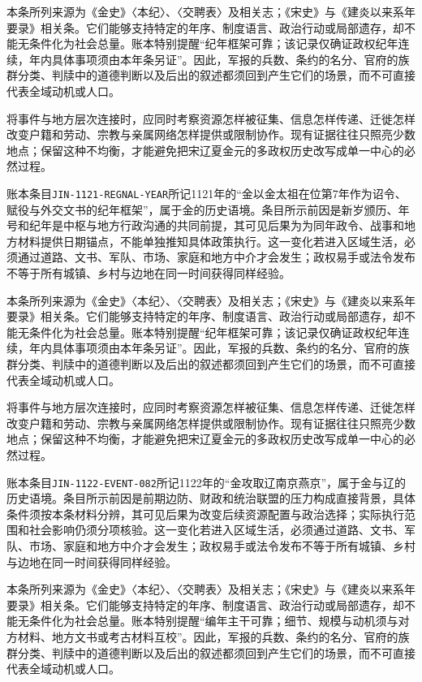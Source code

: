 本条所列来源为《金史》〈本纪〉、〈交聘表〉及相关志；《宋史》与《建炎以来系年要录》相关条。它们能够支持特定的年序、制度语言、政治行动或局部遗存，却不能无条件化为社会总量。账本特别提醒“纪年框架可靠；该记录仅确证政权纪年连续，年内具体事项须由本年条另证”。因此，军报的兵数、条约的名分、官府的族群分类、判牍中的道德判断以及后出的叙述都须回到产生它们的场景，而不可直接代表全域动机或人口。

将事件与地方层次连接时，应同时考察资源怎样被征集、信息怎样传递、迁徙怎样改变户籍和劳动、宗教与亲属网络怎样提供或限制协作。现有证据往往只照亮少数地点；保留这种不均衡，才能避免把宋辽夏金元的多政权历史改写成单一中心的必然过程。

账本条目\texttt{JIN-1121-REGNAL-YEAR}所记1121年的“金以金太祖在位第7年作为诏令、赋役与外交文书的纪年框架”，属于金的历史语境。条目所示前因是新岁颁历、年号和纪年是中枢与地方行政沟通的共同前提，其可见后果为为同年政令、战事和地方材料提供日期锚点，不能单独推知具体政策执行。这一变化若进入区域生活，必须通过道路、文书、军队、市场、家庭和地方中介才会发生；政权易手或法令发布不等于所有城镇、乡村与边地在同一时间获得同样经验。

本条所列来源为《金史》〈本纪〉、〈交聘表〉及相关志；《宋史》与《建炎以来系年要录》相关条。它们能够支持特定的年序、制度语言、政治行动或局部遗存，却不能无条件化为社会总量。账本特别提醒“纪年框架可靠；该记录仅确证政权纪年连续，年内具体事项须由本年条另证”。因此，军报的兵数、条约的名分、官府的族群分类、判牍中的道德判断以及后出的叙述都须回到产生它们的场景，而不可直接代表全域动机或人口。

将事件与地方层次连接时，应同时考察资源怎样被征集、信息怎样传递、迁徙怎样改变户籍和劳动、宗教与亲属网络怎样提供或限制协作。现有证据往往只照亮少数地点；保留这种不均衡，才能避免把宋辽夏金元的多政权历史改写成单一中心的必然过程。

账本条目\texttt{JIN-1122-EVENT-082}所记1122年的“金攻取辽南京燕京”，属于金与辽的历史语境。条目所示前因是前期边防、财政和统治联盟的压力构成直接背景，具体条件须按本条材料分辨，其可见后果为改变后续资源配置与政治选择；实际执行范围和社会影响仍须分项核验。这一变化若进入区域生活，必须通过道路、文书、军队、市场、家庭和地方中介才会发生；政权易手或法令发布不等于所有城镇、乡村与边地在同一时间获得同样经验。

本条所列来源为《金史》〈本纪〉、〈交聘表〉及相关志；《宋史》与《建炎以来系年要录》相关条。它们能够支持特定的年序、制度语言、政治行动或局部遗存，却不能无条件化为社会总量。账本特别提醒“编年主干可靠；细节、规模与动机须与对方材料、地方文书或考古材料互校”。因此，军报的兵数、条约的名分、官府的族群分类、判牍中的道德判断以及后出的叙述都须回到产生它们的场景，而不可直接代表全域动机或人口。

